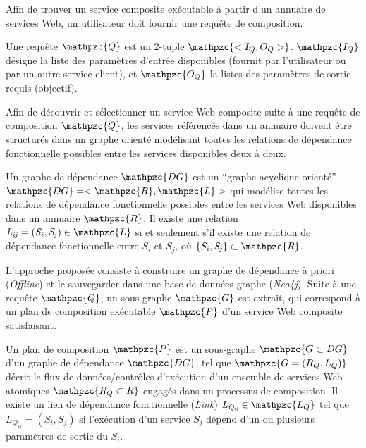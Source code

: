 Afin de trouver un service composite exécutable à partir d'un annuaire
de services Web, un utilisateur doit fournir une requête de
composition.\medskip

\begin{mydef}
  Une requête $\mathpzc{Q}$ est un 2-tuple $\mathpzc{<I_Q, O_Q>}$.
  $\mathpzc{I_Q}$ désigne la liste des paramètres d'entrée disponibles
  (fournit par l'utilisateur ou par un autre service client), et
  $\mathpzc{O_Q}$ la listes des paramètres de sortie requis
  (objectif).
\end{mydef}

Afin de découvrir et sélectionner un service Web composite suite à une
requête de composition $\mathpzc{Q}$, les services référencés dans un
annuaire doivent être structurés dans un graphe orienté modélisant
toutes les relations de dépendance fonctionnelle possibles entre les
services disponibles deux à deux.\medskip



\begin{mydef}
  Un graphe de dépendance $\mathpzc{DG}$ est un ``graphe acyclique
  orienté'' $\mathpzc{DG}=<\mathpzc{R}, \mathpzc{L}>$ qui modélise
  toutes les relations de dépendance fonctionnelle possibles entre les
  services Web disponibles dans un annuaire $\mathpzc{R}$. Il existe
  une relation
  $\mathit{L_{ij}}=(\mathit{S_i}, \mathit{S_j}) \in \mathpzc{L}$ si et
  seulement s'il existe une relation de dépendance fonctionnelle entre
  $\mathit{S_i}$ et $\mathit{S_j}$, où
  $\{\mathit{S_i, S_j}\} \subset \mathpzc{R}$.\medskip
\end{mydef}

L'approche proposée consiste à construire un graphe de dépendance à
priori (\textit{Offline}) et le sauvegarder dans une base de données
graphe (\textit{Neo4j}). Suite à une requête $\mathpzc{Q}$, un
sous-graphe $\mathpzc{G}$ est extrait, qui correspond à un plan de
composition exécutable $\mathpzc{P}$ d'un service Web composite
satisfaisant.\medskip



\begin{mydef}
  Un plan de composition $\mathpzc{P}$ est un sous-graphe
  $\mathpzc{G \subset DG}$ d'un graphe de dépendance $\mathpzc{DG}$,
  tel que $\mathpzc{G=(R_Q,L_Q)}$ décrit le flux de données/contrôles
  d'exécution d'un ensemble de services Web atomiques
  $\mathpzc{R_Q \subset R}$ engagés dans un processus de
  composition. Il existe un lien de dépendance fonctionnelle
  (\textit{Link}) $\mathit{L_{Q_{ij}}} \in \mathpzc{L_Q}$ tel que
  $\mathit{L_{Q_{ij}}} = (S_i, S_j)$ si l'exécution d'un service
  $\mathit{S_j}$ dépend d'un ou plusieurs paramètres de sortie du
  $\mathit{S_i}$.\medskip
\end{mydef}

